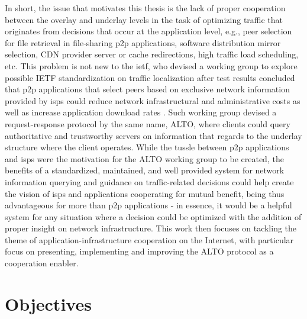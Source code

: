     In short, the issue that motivates this thesis is the lack of proper cooperation between the overlay and underlay levels in the task of optimizing traffic that originates from decisions that occur at the application level, e.g., peer selection for file retrieval in file-sharing \gls{p2p} applications, software distribution mirror selection, CDN provider server or cache redirections, high traffic load scheduling, etc.
    This problem is not new to the \gls{ietf}, who devised a working group to explore possible IETF standardization on traffic localization after test results concluded that \gls{p2p} applications that select peers based on exclusive network information provided by \glspl{isp} could reduce network infrastructural and administrative costs as well as increase application download rates \cite{seedorf2009}.
    Such working group devised a request-response protocol by the same name, ALTO, where clients could query authoritative and trustworthy servers on information that regards to the underlay structure where the client operates.
    While the tussle between \gls{p2p} applications and \glspl{isp} were the motivation for the ALTO working group to be created, the benefits of a standardized, maintained, and well provided system for network information querying and guidance on traffic-related decisions could help create the vision of \glspl{isp} and applications cooperating for mutual benefit, being thus advantageous for more than \gls{p2p} applications - in essence, it would be a helpful system for any situation where a decision could be optimized with the addition of proper insight on network infrastructure.
    This work then focuses on tackling the theme of application-infrastructure cooperation on the Internet, with particular focus on presenting, implementing and improving the ALTO protocol as a cooperation enabler.

\section{Objectives}

